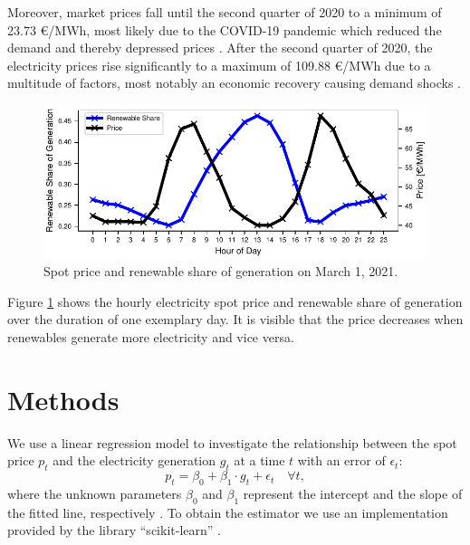 \documentclass{article}
\begin{document}
Moreover, market prices fall until the second quarter of 2020 to a minimum of 23.73 €/MWh, most likely due to the COVID-19 pandemic which reduced the demand and thereby depressed prices \citep{covid_electricity_systems}.
After the second quarter of 2020, the electricity prices rise significantly to a maximum of 109.88 €/MWh due to a multitude of factors, most notably an economic recovery causing demand shocks \citep{long_covid_energy_prices}. 
\begin{figure}[h]
    \centering
    \includegraphics[width=\columnwidth]{doc/fig/example_day.pdf}
    \caption{Spot price and renewable share of generation on March 1, 2021.}
    \label{fig:example_day}
\end{figure}
Figure \ref{fig:example_day} shows the hourly electricity spot price and renewable share of generation over the duration of one exemplary day. 
It is visible that the price decreases when renewables generate more electricity and vice versa. 

\section{Methods} \label{sec:methods}
We use a linear regression model to investigate the relationship between the spot price $p_t$ and the electricity generation $g_t$ at a time $t$ with an error of $\epsilon_t$:
$$
    p_t = \beta_0 + \beta_1\cdot g_t + \epsilon_t \quad \forall t,
$$
where the unknown parameters $\beta_0$ and $\beta_1$ represent the intercept and the slope of the fitted line, respectively \citep{Wasserman2004}.
To obtain the estimator we use an implementation provided by the library \enquote{scikit-learn} \citep{scikit-learn}.
\end{document}

